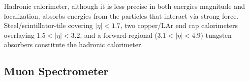 \documentclass[class=NCU_thesis, crop=false]{standalone}
\begin{document}
		Hadronic calorimeter, although it is less precise in both energies magnitude and localization, absorbs energies from the particles that interact via strong force. Steel/scintillator-tile covering $\lvert \eta \rvert < 1.7$, two copper/LAr end cap calorimeters overlaying $1.5 < \lvert \eta \rvert < 3.2$, and a forward-regional ($3.1 < \lvert \eta \rvert < 4.9$) tungsten absorbers constitute the hadronic calorimeter.
	
	\subsection{Muon Spectrometer}
\end{document}
